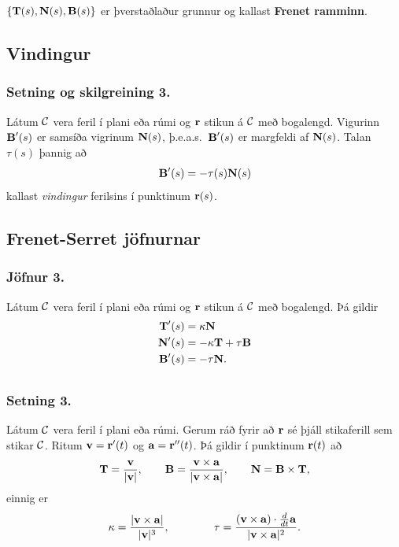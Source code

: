  \bigskip
 $\{\mbox{${\bf T}$}(s),\mbox{${\bf N}$}(s),\mbox{${\bf B}$}(s)\}$ er þverstaðlaður grunnur og kallast \textbf{Frenet ramminn}.


\subsection{Vindingur}
 \subsubsection{Setning og skilgreining 3.}
  Látum $\cal C$ vera feril í plani
eða rúmi og $\mbox{${\bf r}$}$ stikun á $\cal C$ með bogalengd.  Vigurinn $\mbox{${\bf B}$}'(s)$ er
samsíða vigrinum $\mbox{${\bf N}$}(s)$, þ.e.a.s.~$\mbox{${\bf B}$}'(s)$ er margfeldi af $\mbox{${\bf N}$}(s)$.
Talan $\tau(s)$ þannig að  
$$\mbox{${\bf B}$}'(s)=-\tau(s)\mbox{${\bf N}$}(s)$$
kallast {\em vindingur} ferilsins í punktinum $\mbox{${\bf r}$}(s)$.

 




\subsection{Frenet-Serret jöfnurnar}
 \subsubsection{Jöfnur 3.}
   Látum $\cal C$ vera feril í plani
eða rúmi og $\mbox{${\bf r}$}$ stikun á $\cal C$ með bogalengd.  Þá gildir 
\begin{align*}
\mbox{${\bf T}$}'(s)&=\kappa\mbox{${\bf N}$}\\
\mbox{${\bf N}$}'(s)&=-\kappa\mbox{${\bf T}$}+\tau\mbox{${\bf B}$}\\
\mbox{${\bf B}$}'(s)&=-\tau\mbox{${\bf N}$}.
\end{align*}
 



\subsection{}
 \subsubsection{Setning 3.}
   Látum $\cal C$ vera feril í plani eða rúmi. 
Gerum ráð fyrir að $\mbox{${\bf r}$}$ sé þjáll stikaferill
sem stikar $\cal C$. Ritum $\mbox{${\bf v}$}=\mbox{${\bf r}$}'(t)$ og $\mbox{${\bf a}$}=\mbox{${\bf r}$}''(t)$.
Þá gildir í punktinum $\mbox{${\bf r}$}(t)$ að
$$\mbox{${\bf T}$}=\frac{\mbox{${\bf v}$}}{|\mbox{${\bf v}$}|},\qquad 
\mbox{${\bf B}$}=\frac{\mbox{${\bf v}$}\times\mbox{${\bf a}$}}{|\mbox{${\bf v}$}\times\mbox{${\bf a}$}|},\qquad
\mbox{${\bf N}$}=\mbox{${\bf B}$}\times\mbox{${\bf T}$},$$
einnig er 
$$\kappa=\frac{|\mbox{${\bf v}$}\times\mbox{${\bf a}$}|}{|\mbox{${\bf v}$}|^3},\qquad\qquad
\tau=\frac{(\mbox{${\bf v}$}\times\mbox{${\bf a}$})\cdot \frac{d}{dt}\mbox{${\bf a}$}}{|\mbox{${\bf v}$}\times\mbox{${\bf a}$}|^2}.$$

 




